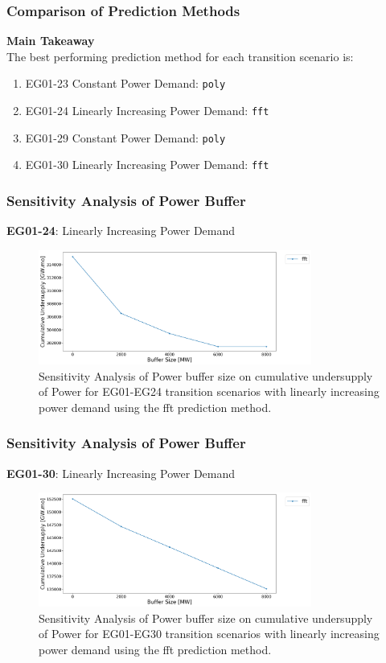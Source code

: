 \begin{frame}
\frametitle{Comparison of Prediction Methods}
\textbf{Main Takeaway}
\\
The best performing prediction method for each transition scenario is: 
\begin{enumerate}
\item EG01-23 Constant Power Demand: \texttt{poly}
\item EG01-24 Linearly Increasing Power Demand: \texttt{fft}
\item EG01-29 Constant Power Demand: \texttt{poly}
\item EG01-30 Linearly Increasing Power Demand: \texttt{fft}
\end{enumerate}
\end{frame}

\begin{frame}
\frametitle{Sensitivity Analysis of Power Buffer}
\textbf{EG01-24}: Linearly Increasing Power Demand
\begin{figure}[htbp!]
	\begin{center}
		\includegraphics[width=0.8\textwidth]{images/24-sens-buffer}
	\end{center}
	\caption{Sensitivity Analysis of Power buffer size on cumulative 
		undersupply of Power for EG01-EG24 transition scenarios 
		with linearly increasing power demand using the fft prediction method.}
\end{figure}
\end{frame}

\begin{frame}
\frametitle{Sensitivity Analysis of Power Buffer}
\textbf{EG01-30}: Linearly Increasing Power Demand
\begin{figure}[htbp!]
\begin{center}
	\includegraphics[width=0.8\textwidth]{images/30-sens-buffer}
\end{center}
\caption{Sensitivity Analysis of Power buffer size on cumulative 
	undersupply of Power for EG01-EG30 transition scenarios 
	with linearly increasing power demand using the fft prediction method.}
\end{figure}
\end{frame}

